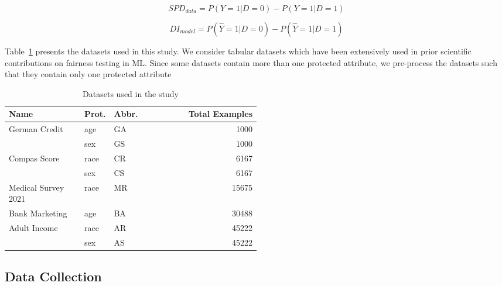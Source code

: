 \documentclass{article}
\begin{document}
\begin{equation}
  SPD_{data} = P(Y=1|D=0)-P(Y=1|D=1)
  \label{eq:spd-data}
\end{equation}

\begin{equation}
  DI_{model} = P(\hat{Y}=1|D=0)-P(\hat{Y}=1|D=1)
  \label{eq:spd-model}
\end{equation}

Table \ref{tab:datasets} presents the datasets used in this study. We
consider tabular datasets which have been extensively used in prior
scientific contributions on fairness testing in ML. Since some
datasets contain more than one protected attribute, we pre-process the
datasets such that they contain only one protected attribute 

\begin{table}
  \centering
  \caption{Datasets used in the study}
  \begin{tabular}{p{0.3\linewidth} p{0.1\linewidth} p{0.1\linewidth} r}
    \toprule
    \textbf{Name} & \textbf{Prot.} & \textbf{Abbr.} &
    \textbf{Total Examples}\\
    \midrule
    \multirow{2}{*}{German Credit \cite{CITEME}} & age & GA &
    1000\\
      & sex & GS & 1000\\
    \multirow{2}{*}{Compas Score \cite{CITEME}} & race & CR &
    6167\\
      & sex & CS & 6167\\
    Medical Survey 2021 \cite{CITEME} & race & MR & 15675\\
    Bank Marketing \cite{CITEME} & age & BA & 30488\\
    \multirow{2}{*}{Adult Income \cite{CITEME}} & race & AR & 45222\\
      & sex & AS & 45222\\
    \bottomrule
  \end{tabular}
  \label{tab:datasets}
\end{table}



\subsection{Data Collection}\label{sec:method-data-collection}
\end{document}
